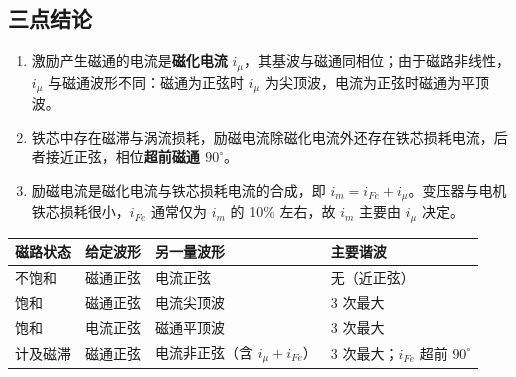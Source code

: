 \subsection{三点结论}
\begin{enumerate}
  \item 激励产生磁通的电流是\textbf{磁化电流} $i_\mu$，其基波与磁通同相位；由于磁路非线性，$i_\mu$ 与磁通波形不同：磁通为正弦时 $i_\mu$ 为尖顶波，电流为正弦时磁通为平顶波。
  \item 铁芯中存在磁滞与涡流损耗，励磁电流除磁化电流外还存在铁芯损耗电流，后者接近正弦，相位\textbf{超前磁通 $90^\circ$}。
  \item 励磁电流是磁化电流与铁芯损耗电流的合成，即 $i_m=i_{Fe}+i_\mu$。变压器与电机铁芯损耗很小，$i_{Fe}$ 通常仅为 $i_m$ 的 10\% 左右，故 $i_m$ 主要由 $i_\mu$ 决定。
\end{enumerate}


\begin{center}
\begin{tabular}{@{}llll@{}}
\toprule
磁路状态 & 给定波形 & 另一量波形 & 主要谐波 \\
\midrule
不饱和 & 磁通正弦 & 电流正弦 & 无（近正弦） \\
饱和 & 磁通正弦 & 电流尖顶波 & 3 次最大 \\
饱和 & 电流正弦 & 磁通平顶波 & 3 次最大 \\
计及磁滞 & 磁通正弦 & 电流非正弦（含 $i_\mu+i_{Fe}$） & 3 次最大；$i_{Fe}$ 超前 $90^\circ$ \\
\bottomrule
\end{tabular}
\end{center}
